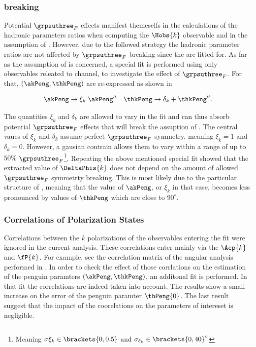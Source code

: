 \subsubsection{\grpsuthree breaking}
\label{su3_breaking}
Potential $\grpsuthree_F$ effects manifest themeselfs in the calculations of the hadronic parameters ratios
when computing the $\Hobs{k}$ observable and in the assumption of . However, due to the
followed strategy the hadronic parameter ratios are not affected by $\grpsuthree_F$ breaking since the are fitted for.
As far as the assumption of  is concerned, a special fit is performed using only observables
releated to \BdJpsiRho channel, to investigate the effect of $\grpsuthree_F$. For that, $(\akPeng,\thkPeng)$
are re-expressed as shown in 

\begin{equation}
  \akPeng \to \xi_k \; \akPeng'' \quad \thkPeng \to \delta_k + \thkPeng''.
\label{su3_breaking}
\end{equation}

\noindent The quantities $\xi_k$ and $\delta_k$ are allowed to vary in the fit and can thus absorb
potential $\grpsuthree_F$ effects that will break the assuption of .
The central vaues of $\xi_k$ and $\delta_k$ assume perfect $\grpsuthree_F$ symmetry, meaning $\xi_k=1$ and $\delta_k=0$.
However, a gausian contrain allows them to vary within a range of up to $50\%$
$\grpsuthree_F$\footnote{Meaning $\sigma{\xi_k}\in\brackets{0,0.5}$ and $\sigma_{\delta_k}\in\brackets{0,40}^\circ$ }.
Repeating the above mentioned special fit showed that the extracted value of $\DeltaPhis{k}$
does not depend on the amount of allowed $\grpsuthree_F$ symmetrty breaking.
This is most likely due to the particular structure of , meaning that
the value of $\akPeng$, or $\xi_k$ in that case, becomes less pronounced by values of
$\thkPeng$ which are close to $90^\circ$.

\subsubsection{Correlations of Polarization States}
Correlations between the $k$ polarizations of the observables entering the \chisq fit were ignored in the
current analysis. These correlations enter mainly via the $\Acp{k}$ and $\fP{k}$. For example, see the
correlation matrix  of the angular analysis performed in .
In order to check the effect of those corrlations on the estimation of the penguin paramters $(\akPeng,\thkPeng)$,
an additonal \chisq fit is performed. In that fit the correlations are indeed taken into account.
The results show a small increase on the error of the penguin paramter $\thPeng{0}$.
The last result suggest that the impact of the coorelations on the parameters of intereset is negligible.
